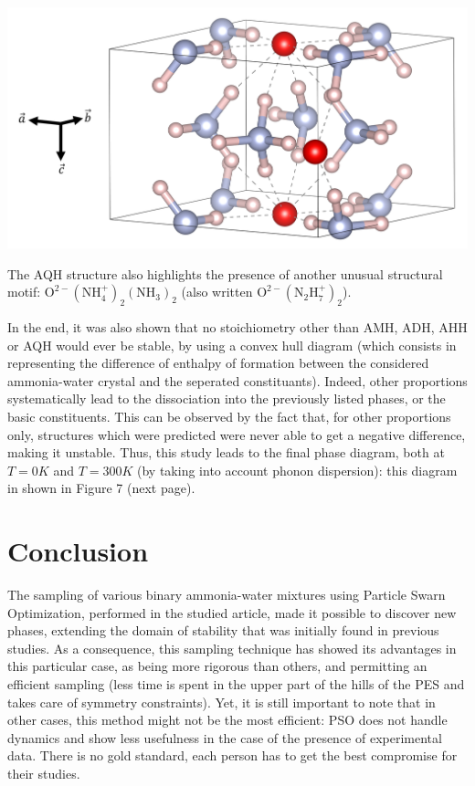 \documentclass[11pt]{article}
\begin{document}
\begin{multicols}{2}
\bigskip
\noindent\begin{center}
    \includegraphics[width=0.9\columnwidth]{figures/AQH.png}
\end{center}
\medskip 

The AQH structure also highlights the presence of another unusual structural motif: $\mathrm{O}^{2-}(\mathrm{N}\mathrm{H}_4^+)_2(\mathrm{N}\mathrm{H}_3)_2$ (also written $\mathrm{O}^{2-}(\mathrm{N}_2\mathrm{H}_7^+)_2$).\vspace{1em}

\noindent In the end, it was also shown that no stoichiometry other than AMH, ADH, AHH or AQH would ever be stable, by using a convex hull diagram (which consists in representing the difference of enthalpy of formation between the considered ammonia-water crystal and the seperated constituants). Indeed, other proportions systematically lead to the dissociation into the previously listed phases, or the basic constituents. This can be observed by the fact that, for other proportions only, structures which were predicted were never able to get a negative difference, making it unstable. Thus, this study leads to the final phase diagram, both at $T=0K$ and $T=300K$ (by taking into account phonon dispersion): this diagram in shown in Figure 7 (next page).

\section*{Conclusion}
The sampling of various binary ammonia-water mixtures using Particle Swarn Optimization, performed in the studied article, made it possible to discover new phases, extending the domain of stability that was initially found in previous studies. As a consequence, this sampling technique has showed its advantages in this particular case, as being more rigorous than others, and permitting an efficient sampling (less time is spent in the upper part of the hills of the PES and takes care of symmetry constraints). Yet, it is still important to note that in other cases, this method might not be the most efficient: PSO does not handle dynamics and show less usefulness in the case of the presence of experimental data. There is no gold standard, each person has to get the best compromise for their studies.

\end{multicols}
\end{document}
